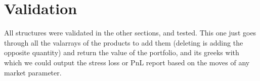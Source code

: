 
\section{Validation}

All structures were validated in the other sections, and tested. This one just goes through all the valarrays of the products to add them (deleting is adding the opposite quantity) and return the value of the portfolio, and its greeks with which we could output the stress loss or PnL report based on the moves of any market parameter.